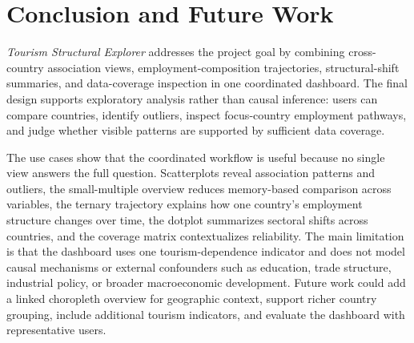\documentclass{vgtc}
\begin{document}
\section{Conclusion and Future Work}

\emph{Tourism Structural Explorer} addresses the project goal by combining cross-country association views, employment-composition trajectories, structural-shift summaries, and data-coverage inspection in one coordinated dashboard. The final design supports exploratory analysis rather than causal inference: users can compare countries, identify outliers, inspect focus-country employment pathways, and judge whether visible patterns are supported by sufficient data coverage.

The use cases show that the coordinated workflow is useful because no single view answers the full question. Scatterplots reveal association patterns and outliers, the small-multiple overview reduces memory-based comparison across variables, the ternary trajectory explains how one country's employment structure changes over time, the dotplot summarizes sectoral shifts across countries, and the coverage matrix contextualizes reliability. The main limitation is that the dashboard uses one tourism-dependence indicator and does not model causal mechanisms or external confounders such as education, trade structure, industrial policy, or broader macroeconomic development. Future work could add a linked choropleth overview for geographic context, support richer country grouping, include additional tourism indicators, and evaluate the dashboard with representative users.



\end{document}
